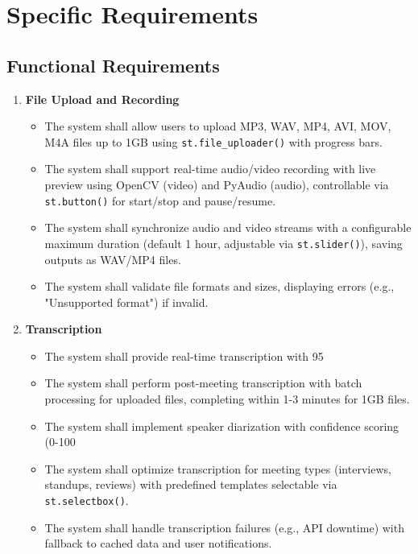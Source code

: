 \documentclass[12pt]{article}
\begin{document}
\section{Specific Requirements}
\subsection{Functional Requirements}
\begin{enumerate}
    \item \textbf{File Upload and Recording}
    \begin{itemize}
        \item The system shall allow users to upload MP3, WAV, MP4, AVI, MOV, M4A files up to 1GB using \texttt{st.file_uploader()} with progress bars.
        \item The system shall support real-time audio/video recording with live preview using OpenCV (video) and PyAudio (audio), controllable via \texttt{st.button()} for start/stop and pause/resume.
        \item The system shall synchronize audio and video streams with a configurable maximum duration (default 1 hour, adjustable via \texttt{st.slider()}), saving outputs as WAV/MP4 files.
        \item The system shall validate file formats and sizes, displaying errors (e.g., "Unsupported format") if invalid.
    \end{itemize}
    \item \textbf{Transcription}
    \begin{itemize}
        \item The system shall provide real-time transcription with 95%
        \item The system shall perform post-meeting transcription with batch processing for uploaded files, completing within 1-3 minutes for 1GB files.
        \item The system shall implement speaker diarization with confidence scoring (0-100%
        \item The system shall optimize transcription for meeting types (interviews, standups, reviews) with predefined templates selectable via \texttt{st.selectbox()}.
        \item The system shall handle transcription failures (e.g., API downtime) with fallback to cached data and user notifications.
    \end{itemize}

\end{enumerate}
\end{document}
